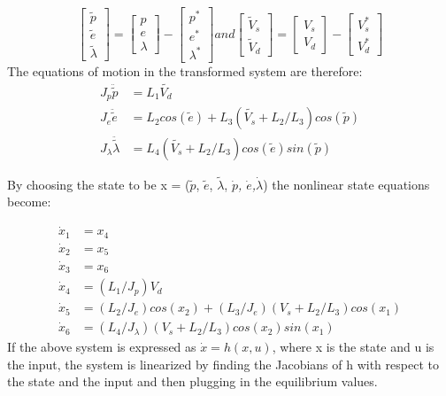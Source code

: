 \begin{equation}
\label{eq:transformation}
  \begin{bmatrix}
    \tilde{p} \\
    \tilde{e} \\
    \tilde{\lambda}
  \end{bmatrix}
  =
  \begin{bmatrix}
    p \\
    e \\
    \lambda
  \end{bmatrix}
  -
  \begin{bmatrix}
    p^{*} \\
    e^{*} \\
    \lambda^{*}
  \end{bmatrix}
  and
  \begin{bmatrix}
    \tilde{V}_{s} \\
    \tilde{V}_{d}
  \end{bmatrix}
  =
  \begin{bmatrix}
    V_{s} \\
    V_{d}
  \end{bmatrix}
  -
  \begin{bmatrix}
    V^{*}_{s} \\
    V^{*}_{d}
  \end{bmatrix}
\end{equation}
The equations of motion in the transformed system are therefore:
\begin{subequations}
  \begin{align}
    J_p\ddot{\tilde{p}} &= L_1\tilde{V_d} \label{eq:transformed pitch EoM}\\
    J_e\ddot{\tilde{e}} &= L_2cos(\tilde{e}) + L_3(\tilde{V_s}+L_2/L_3)cos(\tilde{p}) \label{eq:transformed elevation EoM}\\
    J_{\lambda}\ddot{\tilde{\lambda}} &= L_4(\tilde{V_s}+L_2/L_3)cos(\tilde{e})sin(\tilde{p}) \label{eq:transformed travel EoM}
  \end{align}
\end{subequations}

By choosing the state to be x = ($\tilde{p}$, $\tilde{e}$,
$\tilde{\lambda}$, \textit{$\dot{p}$, $\dot{e}$,$\dot{\lambda}$}) the
nonlinear state equations become:

\begin{subequations}
\label{eq:full state equations}
  \begin{align}
    \dot{x}_1 &= x_4 \\
    \dot{x}_2 &= x_5 \\
    \dot{x}_3 &= x_6 \\
    \dot{x}_4 &= (L_1/J_p) V_d \\
    \dot{x}_5 &= (L_2/J_e)cos(x_2) + (L_3/J_e)(V_s + L_2 / L_3)cos(x_1) \\
    \dot{x}_6 &= (L_4 / J_\lambda) (V_s + L_2 / L_3)cos(x_2)sin(x_1)
  \end{align}
\end{subequations}
If the above system is expressed as $\dot{x} = h(x, u)$, where x is
the state and u is the input, the system is linearized by finding the
Jacobians of h with respect to the state and the input and then
plugging in the equilibrium values.

